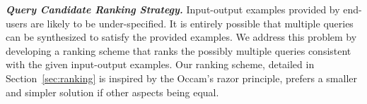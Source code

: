 \vspace{1mm}
\noindent \textbf{\textit{Query Candidate Ranking Strategy.}}
Input-output examples provided by end-users are likely to
be under-specified. It is entirely possible that multiple
queries can be synthesized to satisfy the provided examples.
We address this problem by developing a ranking scheme that 
ranks the possibly multiple queries
consistent with the given input-output
examples. Our ranking scheme, detailed in Section~\ref{sec:ranking}
is inspired by the Occam's razor principle, prefers a smaller and
simpler solution if other aspects being equal.

